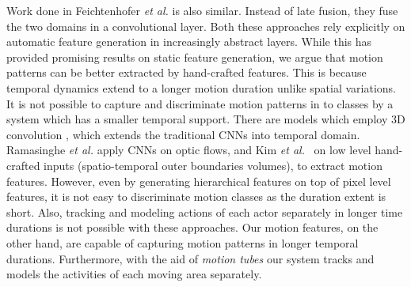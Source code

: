 Work done in Feichtenhofer \textit{et al.}\cite{feichtenhofer2016convolutional} is also similar. Instead of late fusion,
they fuse the two domains in a convolutional layer. Both these approaches rely explicitly on automatic feature
generation in increasingly abstract layers. While this has provided promising results on static feature generation,
we argue that motion patterns can be better extracted by hand-crafted features. This is because
temporal dynamics extend to a longer motion duration unlike spatial variations. It is not possible
to capture and discriminate motion patterns in to classes by a system which has a smaller temporal support. There are models
which employ 3D convolution \cite{ji20133d, tran2015learning}, which extends the traditional CNNs into temporal domain.
Ramasinghe \textit{et al.}\cite{7486474} apply CNNs on optic flows, and Kim \textit{et al.}~\cite{kim2007human} on low level hand-crafted inputs
(spatio-temporal outer boundaries volumes), to extract motion features. However, even by generating hierarchical
features on top of pixel level features, it is not easy to discriminate motion classes as the duration extent is short.
Also, tracking and modeling actions of each actor separately in longer time durations is not possible with these
approaches. Our motion features, on the other hand, are capable of capturing motion patterns in longer temporal durations.
Furthermore, with the aid of \textit{motion tubes} our system tracks and models the activities of each moving area separately.

